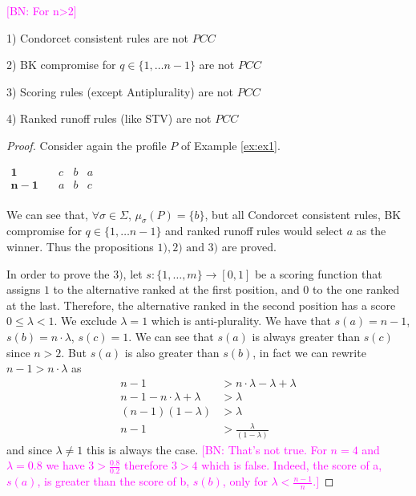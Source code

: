 \documentclass[version=3.21, pagesize, notitlepage, twoside=off, bibliography=totoc, DIV=calc, fontsize=12pt, a4paper]{scrartcl}
\newcommand{\commentBN}[1]{\textcolor{magenta}{\small$\big[$BN: #1$\big]$}}
\newcommand{\musigma}{\mu_{\sigma}}
\begin{document}
\begin{proposition} \commentBN{For n>2}
	\vspace{-4ex} 
	\begin{item}
		\item[1)] Condorcet consistent rules are not $PCC$
		\item[2)] BK compromise for $q \in \{1, \dots n-1\}$ are not $PCC$
		\item[3)] Scoring rules (except Antiplurality) are not $PCC$
		\item[4)] Ranked runoff rules (like STV) are not $PCC$
	\end{item}
\end{proposition}
\begin{proof}
	Consider again the profile $P$ of Example \ref{ex:ex1}.
	\begin{center}
		$
		\begin{array}{cccc}
		\mathbf{1} \quad &c&b&a\\
		\mathbf{n-1} \quad &a&b&c\\		
		\end{array}
		$
	\end{center}
	We can see that, $\forall \sigma \in \Sigma$, $\musigma(P)=\{b\}$, but all Condorcet consistent rules, BK compromise for $q \in \{1, \dots n-1\}$ and ranked runoff rules would select $a$ as the winner. Thus the propositions $1), 2) \text{ and } 3)$ are proved. 
	
	In order to prove the $3)$, let $s:\{1,\dots,m\}\rightarrow [0,1]$ be a scoring function that assigns $1$ to the alternative ranked at the first position, and $0$ to the one ranked at the last. Therefore, the alternative ranked in the second position has a score $0 \leq \lambda<1$. We exclude $\lambda = 1$ which is anti-plurality.
	We have that $s(a)=n-1$, $s(b)=n\cdot \lambda$, $s(c)=1$. We can see that $s(a)$ is always greater than $s(c)$ since $n>2$. But $s(a)$ is also greater than $s(b)$, in fact we can rewrite $n-1>n\cdot\lambda$ as
	\begin{align}
		n-1&>n\cdot\lambda - \lambda + \lambda \\
		n -1 - n\cdot\lambda + \lambda &> \lambda \\
		(n-1)(1-\lambda)&> \lambda \\
		n-1&>\frac{\lambda}{(1-\lambda)}
	\end{align}
	and since $\lambda \neq 1$ this is always the case.
	\commentBN{That's not true. For $n=4$ and $\lambda=0.8$ we have $3 > \frac{0.8}{0.2}$ therefore $3>4$ which is false. Indeed, the score of a, $s(a)$, is greater than the score of b, $s(b)$, only for $\lambda< \frac{n-1}{n}$.}
\end{proof}
\end{document}
